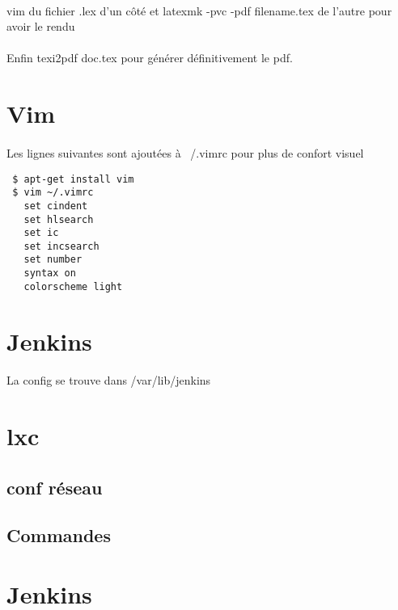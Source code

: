 \documentclass{article}
\begin{document}
\paragraph{}
vim du fichier .lex d'un côté et latexmk -pvc -pdf filename.tex de l'autre pour avoir le rendu
\paragraph{}
Enfin texi2pdf doc.tex pour générer définitivement le pdf.


\section{Vim}\label{vim}
\paragraph{}
Les lignes suivantes sont ajoutées à ~/.vimrc pour plus de confort visuel
\begin{verbatim}
 $ apt-get install vim
 $ vim ~/.vimrc
   set cindent
   set hlsearch
   set ic
   set incsearch
   set number
   syntax on
   colorscheme light
\end{verbatim}

\section{Jenkins}\label{jenkins}
\paragraph{}
La config se trouve dans /var/lib/jenkins

\section{lxc}\label{lxc}
\subsection{conf réseau}
\paragraph{}

\subsection{Commandes}
\section{Jenkins}\label{jenkins}
\end{document}
